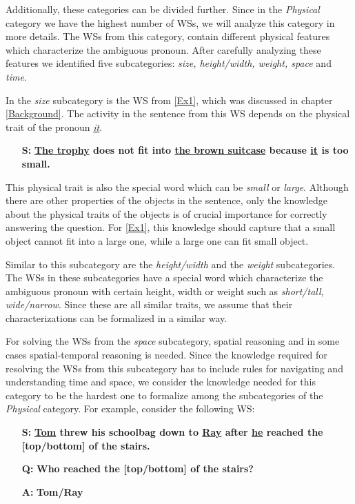 Additionally, these categories can be divided further.
Since in the \textit{Physical} category we have the highest number of WSs, we will analyze this category in more details. The WSs from this category, contain different physical features which characterize the ambiguous pronoun. After carefully analyzing these features we identified five subcategories: \textit{size, height/width, weight, space} and \textit{time}. 

In the \textit{size} subcategory is the WS from \ref{Ex1}, which was discussed in chapter \ref{Background}.
The activity in the sentence from this WS depends on the physical trait of the pronoun \textit{\underline{it}}.
\begin{itemize}
	\item[\textbf{S:}] \textbf{\underline{The trophy} does not fit into \underline{the brown suitcase} because \underline{it} is too small.}
\end{itemize}
This physical trait is also the special word which can be \textit{small} or \textit{large}. Although there are other properties of the objects in the sentence, only the knowledge about the physical traits of the objects is of crucial importance for correctly answering the question. 
For \ref{Ex1}, this knowledge should capture that a small object cannot fit into a large one, while a large one can fit small object.

Similar to this subcategory are the \textit{height/width} and the \textit{weight} subcategories. The WSs in these subcategories have a special word which characterize the ambiguous pronoun with certain height, width or weight such as \textit{short/tall}, \textit{wide/narrow}. Since these are all similar traits, we assume that their characterizations can be formalized in a similar way.


For solving the WSs from the \textit{space} subcategory, spatial reasoning and in some cases spatial-temporal reasoning is needed. Since the knowledge required for resolving the WSs from this subcategory has to include rules for navigating and understanding time and space, we consider the knowledge needed for this category to be the hardest one to formalize among the subcategories of the \textit{Physical} category.
For example, consider the following WS:\\
\begin{itemize} 
	\item[\textbf{S:}] \textbf{\underline{Tom} threw his schoolbag down to \underline{Ray} after \underline{he} reached the [top/bottom] of the stairs.}
	\item[\textbf{Q:}] \textbf{Who reached the [top/bottom] of the stairs?}
	\item[\textbf{A:}] \textbf{Tom/Ray}
\end{itemize}

